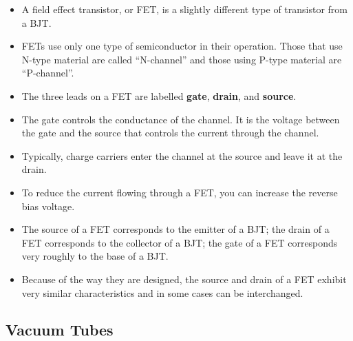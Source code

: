 \documentclass[letterpaper,12pt]{scrartcl}
\begin{document}
\begin{itemize}
\item A field effect transistor, or FET, is a slightly different type of transistor from a BJT.
\item FETs use only one type of semiconductor in their operation. Those that use N-type material are called ``N-channel''
and those using P-type material are ``P-channel''.
\item The three leads on a FET are labelled \textbf{gate}, \textbf{drain}, and \textbf{source}.
\item The gate controls the conductance of the channel. It is the voltage between the gate and the source that controls the current through the channel.
\item Typically, charge carriers enter the channel at the source and leave it at the drain.
\item To reduce the current flowing through a FET, you can increase the reverse bias voltage.
\item The source of a FET corresponds to the emitter of a BJT; the drain of a FET corresponds to the collector of a BJT; the gate of a FET corresponds very roughly to the base of a BJT.
\item Because of the way they are designed, the source and drain of a FET exhibit very similar characteristics and in some cases can be interchanged.
\end{itemize}

\subsection{Vacuum Tubes}
\end{document}
